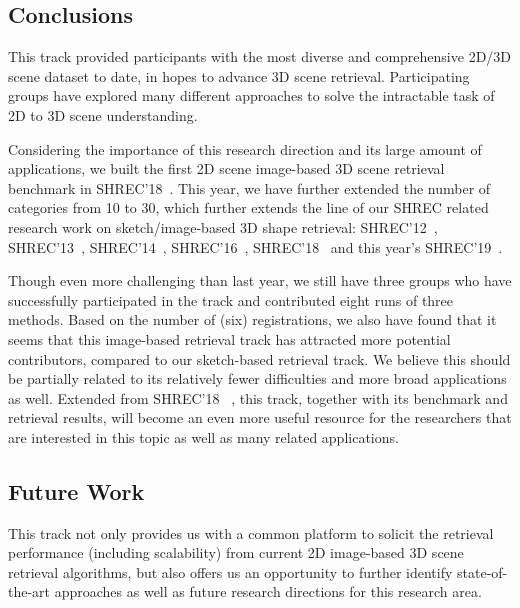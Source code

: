 \documentclass[../main.tex]{subfiles}
\begin{document}
\subsection{Conclusions}
This track provided participants with the most diverse and comprehensive 2D/3D scene dataset to date, in hopes to advance 3D scene retrieval. Participating groups have explored many different approaches to solve the intractable task of 2D to 3D scene understanding.

Considering the importance of this research direction and its large amount of 
applications, we built the first 2D scene image-based 3D scene retrieval 
benchmark in SHREC'18~\cite{SceneIBR18Journal, SceneIBR18Website}. This year, we have further 
extended the number of categories from 10 to 30, which further extends the line 
of our SHREC related research work on sketch/image-based 3D shape retrieval: 
SHREC'12~\cite{DBLP:conf/3dor/LiSGABBCEFHHJKORSSYYY12, 
DBLP:journals/cviu/0013LGSBFFFJMOPS14}, 
SHREC'13~\cite{DBLP:conf/3dor/LiLGSAJST13, 
DBLP:journals/cviu/0013LGSBFFFJMOPS14}, 
SHREC'14~\cite{DBLP:conf/3dor/LiLLGSABFFJLOTZ14, 
DBLP:journals/cviu/LiLLGSABCCFFFLLJKKOTWZZ15}, 
SHREC'16~\cite{DBLP:conf/3dor/0013LDDFQLLLLOT16}, 
SHREC'18~\cite{SceneIBR18Website} and this year's 
SHREC'19~\cite{SceneIBR19}.

Though even more challenging than last year, we still have three groups who 
have successfully participated in the track and contributed eight runs of three 
methods. Based on the number of (six) registrations, we also have found that it 
seems that this image-based retrieval track has attracted more potential 
contributors, compared to our sketch-based retrieval track. We believe this 
should be partially related to its relatively fewer difficulties and more broad 
applications as well. Extended from SHREC'18~\cite{SceneIBR18Website} \cite{SceneIBR18Journal}, 
this track, together with its benchmark and retrieval results, will become an 
even more useful resource for the researchers that are interested in this topic 
as well as many related applications.


\subsection{Future Work}
This track not only provides us with a common platform to solicit the retrieval performance (including scalability) from current 2D image-based 3D scene retrieval algorithms, but also offers us an opportunity to further identify state-of-the-art approaches as well as future research directions for this research area.
\end{document}
